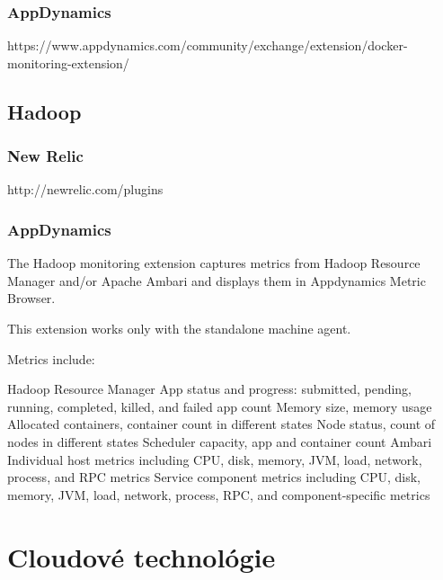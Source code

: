 \documentclass[11pt,final,oneside]{fithesis}
\begin{document}
\subsection{AppDynamics}
https://www.appdynamics.com/community/exchange/extension/docker-monitoring-extension/


\section{Hadoop}
\subsection{New Relic}
http://newrelic.com/plugins

\subsection{AppDynamics}
The Hadoop monitoring extension captures metrics from Hadoop Resource Manager and/or Apache Ambari and displays them in Appdynamics Metric Browser.

This extension works only with the standalone machine agent.


Metrics include:

Hadoop Resource Manager
App status and progress: submitted, pending, running, completed, killed, and failed app count
Memory size, memory usage
Allocated containers, container count in different states
Node status, count of nodes in different states
Scheduler capacity, app and container count
Ambari
Individual host metrics including CPU, disk, memory, JVM, load, network, process, and RPC metrics
Service component metrics including CPU, disk, memory, JVM, load, network, process, RPC, and component-specific metrics
\cite{17}

\chapter{Cloudové technológie}
\end{document}

